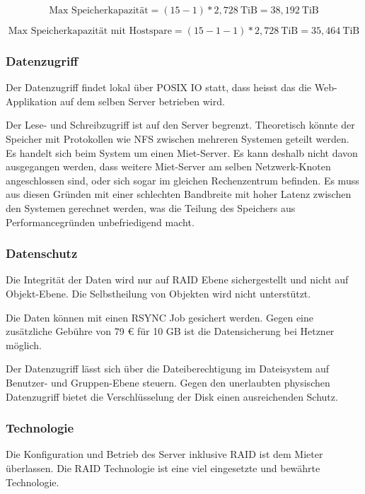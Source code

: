 \begin{equation}
\mbox{Max Speicherkapazität} = (15 -1)* 2,728 \mathrm{\ TiB}= 38,192 \mathrm{\ TiB}
\label{eqn:MaxSpeicherkapazitätHeztner}
\end{equation}

\begin{equation}
\mbox{Max Speicherkapazität mit Hostspare} = (15 -1-1)* 2,728 \mathrm{\ TiB}= 35,464 \mathrm{\ TiB}
\label{eqn:MaxSpeicherkapazitätHeztnerHotspare}
\end{equation}

\subsubsection*{Datenzugriff}
Der Datenzugriff findet lokal über POSIX IO statt, dass heisst das die Web-Applikation auf dem selben Server betrieben wird. 

Der Lese- und Schreibzugriff ist auf den Server begrenzt. Theoretisch könnte der Speicher mit Protokollen wie NFS zwischen mehreren Systemen geteilt werden. Es handelt sich beim System um einen Miet-Server. Es kann deshalb nicht davon ausgegangen werden, dass weitere Miet-Server am selben Netzwerk-Knoten angeschlossen sind, oder sich sogar im gleichen Rechenzentrum befinden. Es muss aus diesen Gründen mit einer schlechten Bandbreite mit hoher Latenz zwischen den Systemen gerechnet werden, was die Teilung des Speichers aus Performancegründen unbefriedigend macht.

\subsubsection*{Datenschutz}
Die Integrität der Daten wird nur auf RAID Ebene sichergestellt und nicht auf Objekt-Ebene. Die Selbstheilung von Objekten wird nicht unterstützt.

Die Daten können mit einen RSYNC Job gesichert werden. Gegen eine zusätzliche Gebühre von 79 € für 10 GB ist die Datensicherung bei Hetzner möglich.

Der Datenzugriff lässt sich über die Dateiberechtigung im Dateisystem auf Benutzer- und Gruppen-Ebene steuern. Gegen den unerlaubten physischen Datenzugriff bietet die Verschlüsselung der Disk einen ausreichenden Schutz.

\subsubsection*{Technologie}
Die Konfiguration und Betrieb des Server inklusive RAID ist dem Mieter überlassen. Die RAID Technologie ist eine viel eingesetzte und bewährte Technologie.

